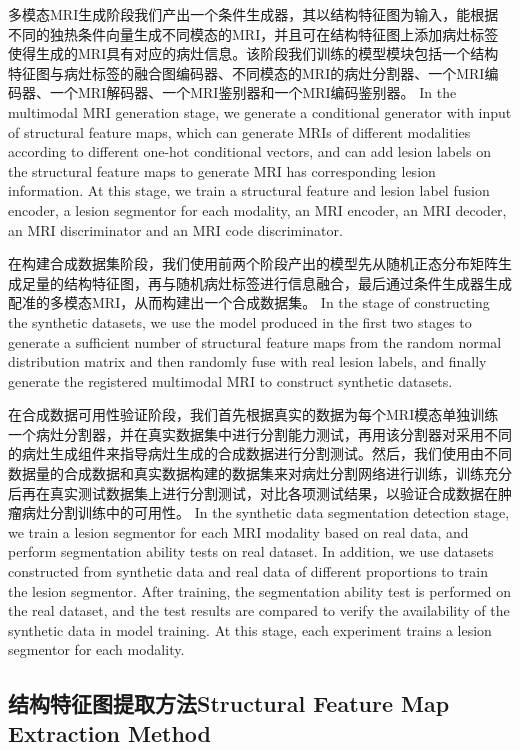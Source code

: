 \documentclass[letterpaper]{article} %
\begin{document}
多模态MRI生成阶段我们产出一个条件生成器，其以结构特征图为输入，能根据不同的独热条件向量生成不同模态的MRI，并且可在结构特征图上添加病灶标签使得生成的MRI具有对应的病灶信息。该阶段我们训练的模型模块包括一个结构特征图与病灶标签的融合图编码器、不同模态的MRI的病灶分割器、一个MRI编码器、一个MRI解码器、一个MRI鉴别器和一个MRI编码鉴别器。
In the multimodal MRI generation stage, we generate a conditional generator with input of structural feature maps, which can generate MRIs of different modalities according to different one-hot conditional vectors, and can add lesion labels on the structural feature maps to generate MRI has corresponding lesion information. At this stage, we train a structural feature and lesion label fusion encoder, a lesion segmentor for each modality, an MRI encoder, an MRI decoder, an MRI discriminator and an MRI code discriminator.

在构建合成数据集阶段，我们使用前两个阶段产出的模型先从随机正态分布矩阵生成足量的结构特征图，再与随机病灶标签进行信息融合，最后通过条件生成器生成配准的多模态MRI，从而构建出一个合成数据集。
In the stage of constructing the synthetic datasets, we use the model produced in the first two stages to generate a sufficient number of structural feature maps from the random normal distribution matrix and then randomly fuse with real lesion labels, and finally generate the registered multimodal MRI to construct synthetic datasets.

在合成数据可用性验证阶段，我们首先根据真实的数据为每个MRI模态单独训练一个病灶分割器，并在真实数据集中进行分割能力测试，再用该分割器对采用不同的病灶生成组件来指导病灶生成的合成数据进行分割测试。然后，我们使用由不同数据量的合成数据和真实数据构建的数据集来对病灶分割网络进行训练，训练充分后再在真实测试数据集上进行分割测试，对比各项测试结果，以验证合成数据在肿瘤病灶分割训练中的可用性。
In the synthetic data segmentation detection stage, we train a lesion segmentor for each MRI modality based on real data, and perform segmentation ability tests on real dataset. In addition, we use datasets constructed from synthetic data and real data of different proportions to train the lesion segmentor. After training, the segmentation ability test is performed on the real dataset, and the test results are compared to verify the availability of the synthetic data in model training. At this stage, each experiment trains a lesion segmentor for each modality.

\subsection{结构特征图提取方法Structural Feature Map Extraction Method}
\end{document}
